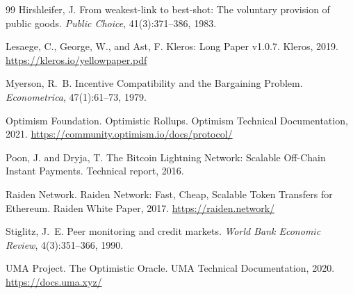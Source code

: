 \documentclass[11pt,a4paper]{article}
\theoremstyle{definition}
\theoremstyle{remark}
\begin{document}
\begin{thebibliography}{99}
Hirshleifer, J.
\newblock From weakest-link to best-shot: The voluntary provision of public
  goods.
\newblock \emph{Public Choice}, 41(3):371--386, 1983.

Lesaege, C., George, W., and Ast, F.
\newblock Kleros: Long Paper v1.0.7.
\newblock Kleros, 2019.
\newblock \url{https://kleros.io/yellowpaper.pdf}

Myerson, R.~B.
\newblock Incentive Compatibility and the Bargaining Problem.
\newblock \emph{Econometrica}, 47(1):61--73, 1979.

Optimism Foundation.
\newblock Optimistic Rollups.
\newblock Optimism Technical Documentation, 2021.
\newblock \url{https://community.optimism.io/docs/protocol/}

Poon, J. and Dryja, T.
\newblock The Bitcoin Lightning Network: Scalable Off-Chain Instant Payments.
\newblock Technical report, 2016.

Raiden Network.
\newblock Raiden Network: Fast, Cheap, Scalable Token Transfers for Ethereum.
\newblock Raiden White Paper, 2017.
\newblock \url{https://raiden.network/}

Stiglitz, J.~E.
\newblock Peer monitoring and credit markets.
\newblock \emph{World Bank Economic Review}, 4(3):351--366, 1990.

UMA Project.
\newblock The Optimistic Oracle.
\newblock UMA Technical Documentation, 2020.
\newblock \url{https://docs.uma.xyz/}

\end{thebibliography}
\end{document}
